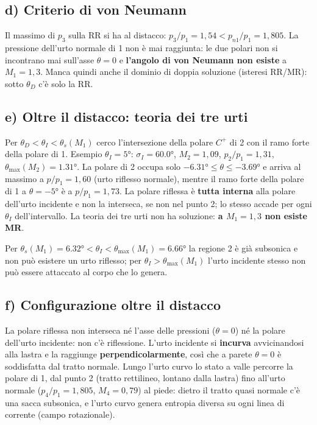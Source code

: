 \documentclass[11pt,a4paper]{article}
\newcommand{\Cp}{C^{+}}
\begin{document}
\subsection*{d) Criterio di von Neumann}
Il massimo di $p_3$ sulla RR si ha al distacco: $p_3/p_1=1{,}54<p_{n1}/p_1=1{,}805$. La pressione dell'urto normale
di 1 non è mai raggiunta: le due polari non si incontrano mai sull'asse $\theta=0$ e \textbf{l'angolo di von Neumann
non esiste} a $M_1=1{,}3$. Manca quindi anche il dominio di doppia soluzione (isteresi RR/MR): sotto $\theta_D$ c'è
solo la RR.

\subsection*{e) Oltre il distacco: teoria dei tre urti}
Per $\theta_D<\theta_I<\theta_s(M_1)$ cerco l'intersezione della polare $\Cp$ di 2 con il ramo forte della polare di 1.
Esempio $\theta_I=\ang{5}$: $\sigma_I=\ang{60.0}$, $M_2=1{,}09$, $p_2/p_1=1{,}31$, $\theta_{\max}(M_2)=\ang{1.31}$. La
polare di 2 occupa solo $-\ang{6.31}\le\theta\le-\ang{3.69}$ e arriva al massimo a $p/p_1=1{,}60$ (urto riflesso
normale), mentre il ramo forte della polare di 1 a $\theta=-\ang{5}$ è a $p/p_1=1{,}73$. La polare riflessa è
\textbf{tutta interna} alla polare dell'urto incidente e non la interseca, se non nel punto 2; lo stesso accade per
ogni $\theta_I$ dell'intervallo. La teoria dei tre urti non ha soluzione: \textbf{a $M_1=1{,}3$ non esiste MR}.

Per $\theta_s(M_1)=\ang{6.32}<\theta_I<\theta_{\max}(M_1)=\ang{6.66}$ la regione 2 è già subsonica e non può esistere
un urto riflesso; per $\theta_I>\theta_{\max}(M_1)$ l'urto incidente stesso non può essere attaccato al corpo che lo
genera.

\subsection*{f) Configurazione oltre il distacco}
La polare riflessa non interseca né l'asse delle pressioni ($\theta=0$) né la polare dell'urto incidente: non c'è
riflessione. L'urto incidente si \textbf{incurva} avvicinandosi alla lastra e la raggiunge \textbf{perpendicolarmente},
così che a parete $\theta=0$ è soddisfatta dal tratto normale. Lungo l'urto curvo lo stato a valle percorre la polare
di 1, dal punto 2 (tratto rettilineo, lontano dalla lastra) fino all'urto normale ($p_4/p_1=1{,}805$, $M_4=0{,}79$) al
piede: dietro il tratto quasi normale c'è una sacca subsonica, e l'urto curvo genera entropia diversa su ogni linea
di corrente (campo rotazionale).
\end{document}
